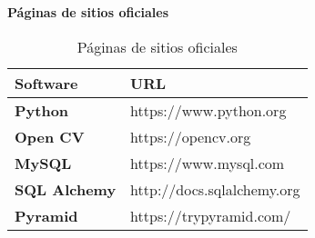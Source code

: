 \textbf{Páginas de sitios oficiales}
\begin{longtable}{ | p{2.5cm} | p{4.5cm} |  }
	\caption{Páginas de sitios oficiales}
	\label{table:sitiosoficiales}
	\\	\hline
		 \textbf{Software} &\textbf{URL}
		\\ \hline
        \textbf{Python}&https://www.python.org
        \\ \hline
        \textbf{Open CV}&https://opencv.org
        \\ \hline
        \textbf{MySQL}&https://www.mysql.com
        \\ \hline
        \textbf{SQL Alchemy}& http://docs.sqlalchemy.org
        \\ \hline
        \textbf{Pyramid}& https://trypyramid.com/
        \\ \hline
\end{longtable}